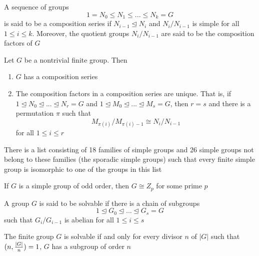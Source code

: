 \begin{definition}
	A sequence of groups
	\[
	1 = N_0 \leq N_1 \leq ... \leq N_k = G
	\]
	is said to be a composition series if $N_{i-1} \trianglelefteq N_i$ and $N_i / N_{i-1}$ is simple for all $1 \leq i \leq k$. Moreover, the quotient groups $N_i / N_{i-1}$ are said to be the composition factors of $G$
\end{definition}

\begin{theorem}
	Let $G$ be a nontrivial finite group. Then
	\begin{enumerate}
		\item $G$ has a composition series
		\item The composition factors in a composition series are unique. That is, if $1 \trianglelefteq N_0 \trianglelefteq ... \trianglelefteq N_r = G$ and $1 \trianglelefteq M_0 \trianglelefteq ... \trianglelefteq M_s = G$, then $r = s$ and there is a permutation $\pi$ such that
		\[
		M_{\pi(i)} / M_{\pi(i)-1} \cong N_{i} / N_{i-1}
		\]
		for all $1 \leq i \leq r$
	\end{enumerate}
\end{theorem}

\begin{theorem}
	There is a list consisting of 18 families of simple groups and 26 simple groups not belong to these families (the sporadic simple groups) such that every finite simple group is isomorphic to one of the groups in this list
\end{theorem}

\begin{theorem}
	If $G$ is a simple group of odd order, then $G \cong Z_p$ for some prime $p$
\end{theorem}

\begin{definition}
	A group $G$ is said to be solvable if there is a chain of subgroups 
	\[
	1 \trianglelefteq G_0 \trianglelefteq ... \trianglelefteq G_s = G
	\]
	such that $G_i / G_{i-1}$ is abelian for all $1 \leq i \leq s$
\end{definition}

\begin{theorem}
	The finite group $G$ is solvable if and only for every divisor $n$ of $|G|$ such that $(n, \frac{|G|}{n}) = 1$, $G$ has a subgroup of order $n$
\end{theorem}


